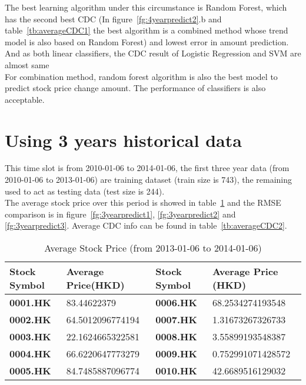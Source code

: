 The best learning algorithm under this circumstance is Random Forest, which has the second best CDC (In figure~\ref{fg:4yearpredict2}.b and table~\ref{tb:averageCDC1} the best algorithm is a combined method whose trend model is also based on Random Forest) and lowest error in amount prediction. And as both linear classifiers, the CDC result of Logistic Regression and SVM are almost same\\


For combination method, random forest algorithm is also the best model to predict stock price change amount. The performance of classifiers is also acceptable.


\section{Using 3 years historical data}

This time slot is from 2010-01-06 to 2014-01-06, the first three year data (from 2010-01-06 to 2013-01-06) are training dataset (train size is 743), the remaining used to act as testing data (test size is 244).\\


The average stock price over this period is showed in table~\ref{tb:avg20132014} and the RMSE comparison is in figure~\ref{fg:3yearpredict1}, \ref{fg:3yearpredict2} and \ref{fg:3yearpredict3}. Average CDC info can be found in table~\ref{tb:averageCDC2}.\\
\begin{table}[h]
	\centering
	\begin{tabular}{|l|l|l|l|}
		\hline
		\textbf{Stock Symbol} & \textbf{Average Price(HKD)} & \textbf{Stock Symbol} & \textbf{Average Price (HKD)} \\ \hline
		\textbf{0001.HK}      & 83.44622379       & \textbf{0006.HK}      & 68.2534274193548      \\ \hline
		\textbf{0002.HK}      & 64.5012096774194     & \textbf{0007.HK}      & 1.31673267326733      \\ \hline
		\textbf{0003.HK}      & 22.1624665322581      & \textbf{0008.HK}      & 3.55899193548387      \\ \hline
		\textbf{0004.HK}      & 66.6220647773279      & \textbf{0009.HK}      & 0.752991071428572     \\ \hline
		\textbf{0005.HK}      & 84.7485887096774      & \textbf{0010.HK}      & 42.6689516129032      \\ \hline
	\end{tabular}
	\caption{Average Stock Price (from 2013-01-06 to 2014-01-06)}
	\label{tb:avg20132014}
\end{table}

